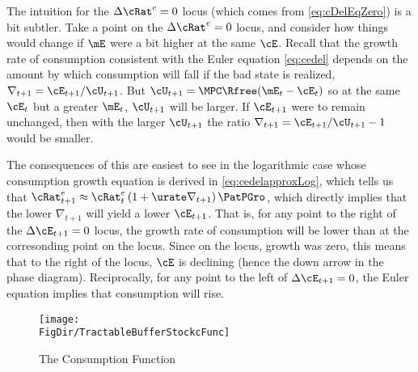 \documentclass{\handout}
\begin{document}

The intuition for the $\Delta {\cRat}^{e}_{\tSS}=0$ locus (which comes from
\eqref{eq:cDelEqZero}) is a bit subtler.  Take a point on 
the $\Delta {\cRat}^{e}_{\tSS}=0$ locus, and consider how things 
would change if $\mE$ were a bit higher at the same $\cE$.  
Recall that the growth rate of consumption consistent with 
the Euler equation \eqref{eq:cedel} depends on the amount by which consumption will
fall if the bad state is realized, $\nabla_{t+1} = \cE_{t+1}/\cU_{t+1}$.  
But $\cU_{t+1} = \MPCU \Rfree (\mE_{t} - \cE_{t})$ so at the same $\cE_{t}$ but 
a greater $\mE_{t}$, $\cU_{t+1}$ will be larger.  If $\cE_{t+1}$ were to remain
unchanged, then with the larger $\cU_{t+1}$ the ratio $\nabla_{t+1} = \cE_{t+1}/\cU_{t+1}-1$ would be smaller.

The consequences of this are easiest to see in the logarithmic case whose consumption growth equation is derived in \eqref{eq:cedelapproxLog}, which tells us that ${\cRat}^{e}_{t+1} \approx {\cRat}^{e}_{t}\left(1+ \urate \nabla _{t+1}\right) {\PatPGro}$, which directly 
implies that the lower $\nabla_{t+1}$ will yield a lower $\cE_{t+1}$.  That is, for any point to the right of the $\Delta \cE_{t+1}=0$ locus, the growth rate of consumption will be lower than at the corresonding point on the locus.  Since on the locus, growth
was zero, this means that to the right of the locus, $\cE$ is declining (hence the down arrow in the phase diagram).  Reciprocally, for any point to the left of $\Delta \cE_{t+1}=0$, the Euler equation implies that consumption will rise.


\begin{figure}
\caption{The Consumption Function}\label{fig:cFunc}
\texttt{[image: \\FigDir/TractableBufferStockcFunc]}
\end{figure}
\end{document}
